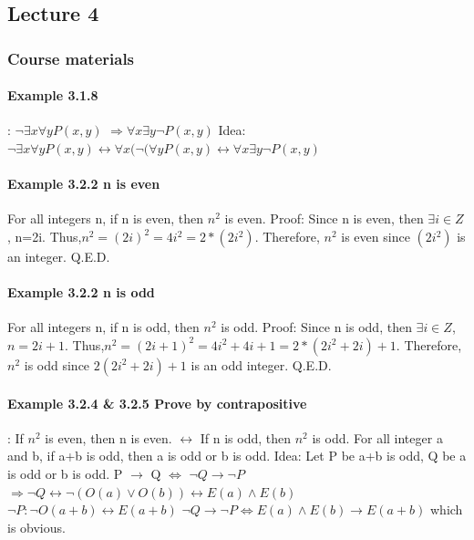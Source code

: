 \documentclass{article}
\begin{document}
\subsection{Lecture 4}
\subsubsection{Course materials}
\paragraph{Example 3.1.8}:\newline
$\lnot \exists x \forall y P(x,y)$\newline
$\Longrightarrow \forall x \exists y \lnot P(x,y)$\newline
Idea: $\lnot \exists x \forall y P(x,y) \leftrightarrow \forall x (\lnot(\forall y P(x,y) \leftrightarrow \forall x \exists y \lnot P(x,y)$ 
\paragraph{Example 3.2.2 n is even}
For all integers n, if n is even, then $n^2$ is even.\newline
Proof:\newline
Since n is even, then $\exists i \in Z$, n=2i.\newline
Thus,$n^2=(2i)^2=4i^2=2*(2i^2)$.\newline
Therefore, $n^2$ is even since $(2i^2)$ is an integer.\newline
Q.E.D.
\paragraph{Example 3.2.2 n is odd}
For all integers n, if n is odd, then $n^2$ is odd.\newline
Proof:\newline
Since n is odd, then $\exists i \in Z$, $n=2i+1$.\newline
Thus,$n^2=(2i+1)^2=4i^2+4i+1=2*(2i^2+2i)+1$.\newline
Therefore, $n^2$ is odd since $2(2i^2+2i)+1$ is an odd integer.\newline
Q.E.D.
\paragraph{Example 3.2.4 \& 3.2.5 Prove by contrapositive}:\newline
If $n^2$ is even, then n is even. $\leftrightarrow$ If n is odd, then $n^2$ is odd.\newline
For all integer a and b, if a+b is odd, then a is odd or b is odd.\newline
Idea:\newline
Let P be a+b is odd, Q be a is odd or b is odd. \newline
P $\to$ Q $\Leftrightarrow$ $\lnot Q \to \lnot P$\newline
$\Rightarrow \lnot Q \leftrightarrow \lnot(O(a)\lor O(b))\leftrightarrow E(a)\land E(b)$ \newline
$\lnot P: \lnot O(a+b) \leftrightarrow E(a+b)$\newline
$\lnot Q \to \lnot P \Leftrightarrow E(a)\land E(b) \to E(a+b)$ which is obvious.
\end{document}
